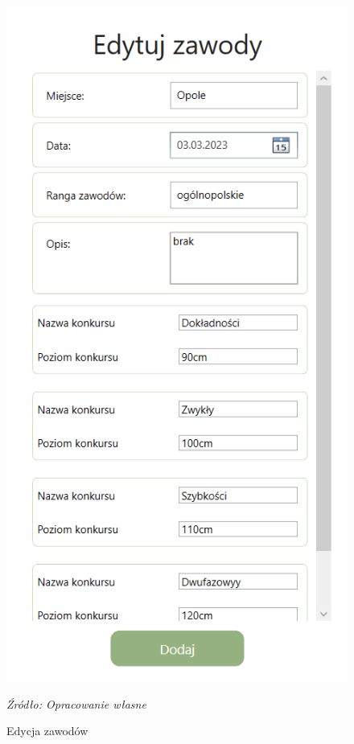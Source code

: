 \documentclass[12pt,oneside]{report}
\begin{document}
\begin{figure} [H]
\begin{center}
		\hfil
		\begin{minipage}{6cm}
			\centering
			\includegraphics[scale=0.7]{edytujZawody}
			\caption{Edycja zawodów}
			\textit{Źródło: Opracowanie własne}
			\label{edytujZawody}
		\end{minipage}
	\end{center}
\end{figure}
\end{document}
